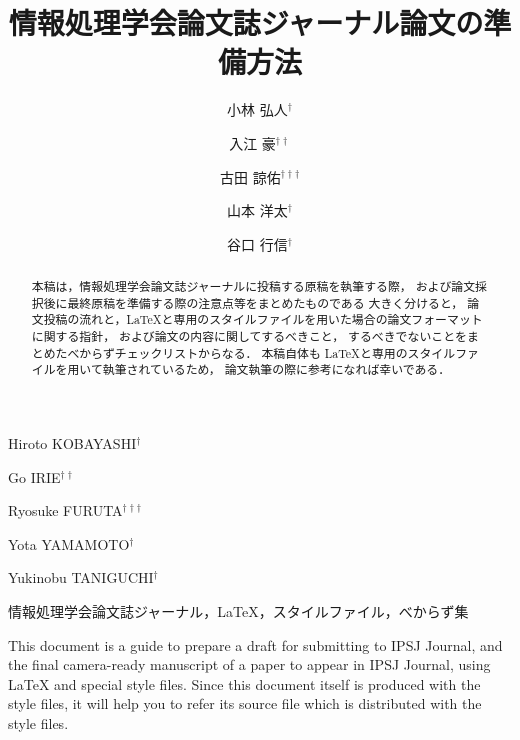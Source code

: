 \documentclass[submit]{ipsj}
\begin{document}
\title{情報処理学会論文誌ジャーナル論文の準備方法}

\author{小林 弘人$^{\dag}$}{Hiroto KOBAYASHI$^{\dag}$}{}
\author{入江 豪$^{\dag\dag}$}{Go IRIE$^{\dag\dag}$}{}
\author{古田 諒佑$^{\dag\dag\dag}$}{Ryosuke FURUTA$^{\dag\dag\dag}$}{}
\author{山本 洋太$^{\dag}$}{Yota YAMAMOTO$^{\dag}$}{}
\author{谷口 行信$^{\dag}$}{Yukinobu TANIGUCHI$^{\dag}$}{} 


\begin{abstract}
本稿は，情報処理学会論文誌ジャーナルに投稿する原稿を執筆する際，
および論文採択後に最終原稿を準備する際の注意点等をまとめたものである
大きく分けると，
論文投稿の流れと，\LaTeX と専用のスタイルファイルを用いた場合の論文フォーマットに関する指針，
および論文の内容に関してするべきこと，
するべきでないことをまとめたべからずチェックリストからなる．
本稿自体も \LaTeX と専用のスタイルファイルを用いて執筆されているため，
論文執筆の際に参考になれば幸いである．
\end{abstract}

\begin{jkeyword}
情報処理学会論文誌ジャーナル，\LaTeX，スタイルファイル，べからず集
\end{jkeyword}

\begin{eabstract}
This document is a guide to prepare a draft for submitting to IPSJ
Journal, and the final camera-ready manuscript of a paper to appear in
IPSJ Journal, using {\LaTeX} and special style files.  Since this
document itself is produced with the style files, it will help you to
refer its source file which is distributed with the style files.
\end{eabstract}
\end{document}
